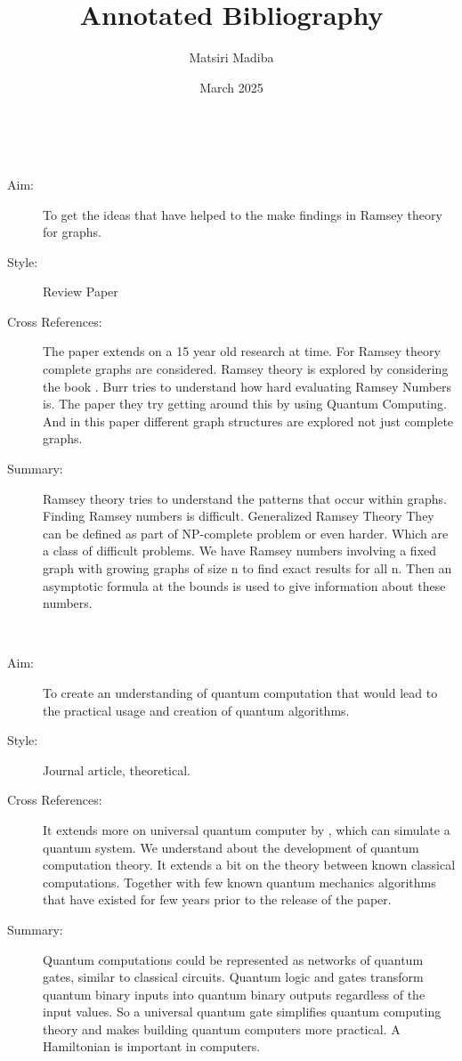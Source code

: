 \documentclass{Assignment}
\author{Matsiri Madiba}
\date{March 2025}
\title{Annotated Bibliography}
\begin{document}
\maketitle
\cite{burr1981generalized}~
\begin{description}
	\item[Aim:]
To get the ideas that have helped to the make findings in Ramsey theory for graphs.
\item[Style:]
Review Paper
\item[Cross References:]
The paper extends on a 15 year old research at time.
For Ramsey theory complete graphs are considered. 
Ramsey theory is explored by considering the book \cite{graham1980ramsey}.
Burr tries to understand how hard evaluating Ramsey Numbers is.
The paper \cite{PhysRevA.93.032301} they try getting around this by using Quantum Computing.
And in this paper different graph structures are explored not just complete graphs.
\item [Summary:]
Ramsey theory tries to understand the patterns that occur within graphs.
Finding Ramsey numbers is difficult.
Generalized Ramsey Theory 
They can be defined as part of NP-complete problem or even harder.
Which are a class of difficult problems.
We have Ramsey numbers involving a fixed graph with growing graphs of size n to find exact results for all n. 
Then an asymptotic formula at the bounds is used to give information about these numbers.  
\end{description}
\newpage
\cite{f3197c3a-bce3-3c72-b6d6-c1ee34ac9328}~
	    \begin{description}
			\item [ Aim:]
		To create an understanding of quantum computation that would lead to the practical usage and creation of quantum algorithms.
		\item[Style:]
		Journal article, theoretical.
		\item[Cross References:]
		It extends more on universal quantum computer by \cite{deutsch1985quantum}, which can simulate a quantum system. 
		We understand about the development of quantum computation theory.
		It extends a bit on the theory between known classical computations. 
		Together with few known quantum mechanics algorithms that have existed for few years prior to the release of the paper.
		\item [Summary:]
		Quantum computations could be represented as networks of quantum gates, similar to classical circuits.
		Quantum logic and gates transform quantum binary inputs into quantum binary outputs regardless of the input values.
		So a universal quantum gate simplifies quantum computing theory and makes building quantum computers more practical. 
	A Hamiltonian is important in computers.
	\end{description}
\end{document}
